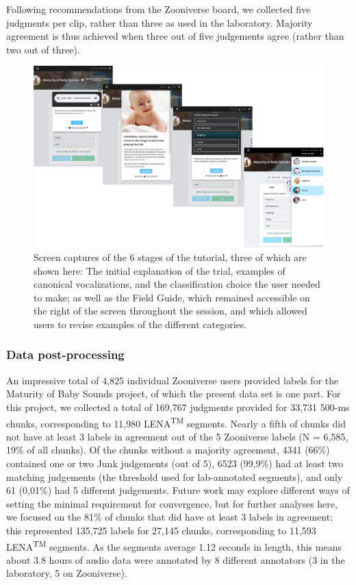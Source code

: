 \documentclass[english,,man,floatsintext]{apa6}
\begin{document}
Following recommendations from the Zooniverse board, we collected five judgments per clip, rather than three as used in the laboratory. Majority agreement is thus achieved when three out of five judgements agree (rather than two out of three).

\begin{figure}
\centering
\includegraphics{zooniverse-pufig.pdf}
\caption{\label{fig:fig-zoo}Screen captures of the 6 stages of the tutorial, three of which are shown here: The initial explanation of the trial, examples of canonical vocalizations, and the classification choice the user needed to make; as well as the Field Guide, which remained accessible on the right of the screen throughout the session, and which allowed users to revise examples of the different categories.}
\end{figure}

\hypertarget{data-post-processing}{%
\subsubsection{Data post-processing}\label{data-post-processing}}

An impressive total of 4,825 individual Zooniverse users provided labels for the Maturity of Baby Sounds project, of which the present data set is one part. For this project, we collected a total of 169,767 judgments provided for 33,731 500-ms chunks, corresponding to 11,980 LENA\textsuperscript{TM} segments. Nearly a fifth of chunks did not have at least 3 labels in agreement out of the 5 Zooniverse labels (N = 6,585, 19\% of all chunks). Of the chunks without a majority agreement, 4341 (66\%) contained one or two Junk judgements (out of 5), 6523 (99,9\%) had at least two matching judgements (the threshold used for lab-annotated segments), and only 61 (0,01\%) had 5 different judgements. Future work may explore different ways of setting the minimal requirement for convergence, but for further analyses here, we focused on the 81\% of chunks that did have at least 3 labels in agreement; this represented 135,725 labels for 27,145 chunks, corresponding to 11,593 LENA\textsuperscript{TM} segments. As the segments average 1.12 seconds in length, this means about 3.8 hours of audio data were annotated by 8 different annotators (3 in the laboratory, 5 on Zooniverse).
\end{document}
